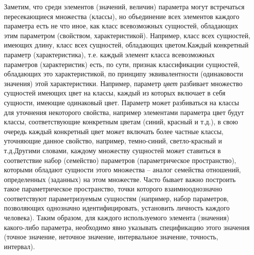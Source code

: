 \begin{SCn}
\begin{scnsubstruct}
{            Заметим, что среди элементов (значений, величин) параметра могут встречаться пересекающиеся множества (классы), но объединение всех элементов каждого параметра есть не что иное, как класс всевозможных сущностей, обладающих этим параметром (свойством, характеристикой). Например, класс всех сущностей, имеющих длину, класс всех сущностей, обладающих цветом.Каждый конкретный параметр (характеристика), т.е. каждый элемент класса всевозможных параметров (характеристик) есть, по сути, признак классификации сущностей, обладающих это характеристикой, по принципу эквивалентности (одинаковости значения) этой характеристики. Например, параметр \textit{цвет} разбивает множество сущностей имеющих цвет на классы, каждый из которых включает в себя сущности, имеющие одинаковый цвет. Параметр может разбиваться на классы для уточнения некоторого свойства, например элементами параметра цвет будут классы, соответствующие конкретным цветам (синий, красный и т.д.), в свою очередь каждый конкретный цвет может включать более частные классы, уточняющие данное свойство, например, темно-синий, светло-красный и т.д.Другими словами, каждому множеству сущностей может ставиться в соответствие набор (семейство) параметров (параметрическое пространство), которыми обладают сущности этого множества -- аналог семейства отношений, определенных (заданных) на этом множестве. Часто бывает важно построить такое параметрическое пространство, точки которого взаимнооднозначно соответствуют параметризуемым сущностям (например, набор параметров, позволяющих однозначно идентифицировать, установить личность каждого человека). Таким образом, для каждого используемого элемента (значения) какого-либо параметра, необходимо явно указывать спецификацию этого значения (точное значение, неточное значение, интервальное значение, точность, интервал).}
      
       
       

\end{scnsubstruct}
\end{SCn}
